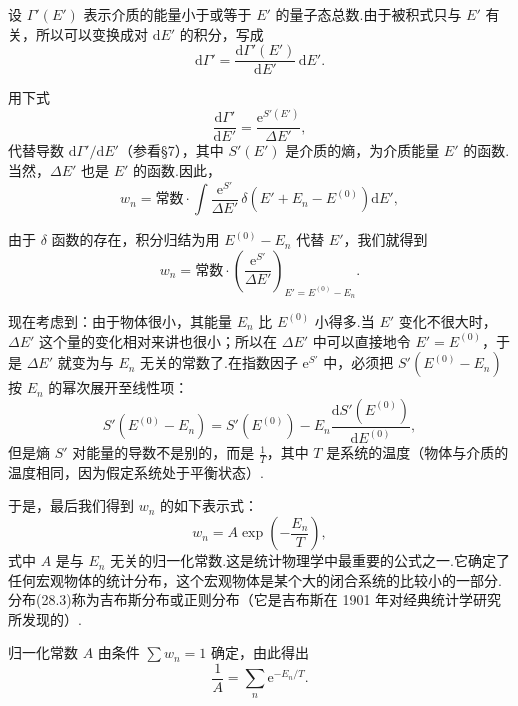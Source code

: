设 $\varGamma'(E')$ 表示介质的能量小于或等于 $E'$ 的量子态总数.由于被积式只与 $E'$ 有关，所以可以变换成对 $\mathrm{d}E'$ 的积分，写成
\begin{equation*}
  \mathrm{d}\varGamma'=\frac{\mathrm{d}\varGamma'(E')}{\mathrm{d}E'}\,\mathrm{d}E'.
\end{equation*}

用下式
\begin{equation*}
  \frac{\mathrm{d}\varGamma'}{\mathrm{d}E'}=\frac{\mathrm{e}^{S'(E')}}{\Delta E'},
\end{equation*}
代替导数 $\mathrm{d}\varGamma'/\mathrm{d}E'$（参看§7），其中 $S'(E')$ 是介质的熵，为介质能量 $E'$ 的函数.当然，$\Delta E'$ 也是 $E'$ 的函数.因此，
\begin{equation*}
  w_n=\text{常数}\cdot\int\frac{\mathrm{e}^{S'}}{\Delta E'}\,\delta\left(E'+E_n-E^{(0)}\right)\mathrm{d}E',
\end{equation*}

由于 $\delta$ 函数的存在，积分归结为用 $E^{(0)}-E_n$ 代替 $E'$，我们就得到
\begin{equation}
  w_n=\text{常数}\cdot\left(\frac{\mathrm{e}^{S'}}{\Delta E'}\right)_{E'=E^{(0)}-E_n}.
\end{equation}

现在考虑到：由于物体很小，其能量 $E_n$ 比 $E^{(0)}$ 小得多.当 $E'$ 变化不很大时，$\Delta E'$ 这个量的变化相对来讲也很小；所以在 $\Delta E'$ 中可以直接地令 $E'=E^{(0)}$，于是 $\Delta E'$ 就变为与 $E_n$ 无关的常数了.在指数因子 $\mathrm{e}^{S'}$ 中，必须把 $S'(E^{(0)}-E_n)$ 按 $E_n$ 的幂次展开至线性项：
\begin{equation*}
  S'\left(E^{(0)}-E_n\right)=S'\left(E^{(0)}\right)-E_n\frac{\mathrm{d}S'\left(E^{(0)}\right)}{\mathrm{d}E^{(0)}},
\end{equation*}
但是熵 $S'$ 对能量的导数不是别的，而是 $\frac{1}{T}$，其中 $T$ 是系统的温度（物体与介质的温度相同，因为假定系统处于平衡状态）.

于是，最后我们得到 $w_n$ 的如下表示式：
\begin{equation}
  w_n=A\exp\left(-\frac{E_n}{T}\right),
\end{equation}
式中 $A$ 是与 $E_n$ 无关的归一化常数.这是统计物理学中最重要的公式之一.它确定了任何宏观物体的统计分布，这个宏观物体是某个大的闭合系统的比较小的一部分.分布(28.3)称为吉布斯分布或正则分布（它是吉布斯在 1901 年对经典统计学研究所发现的）.

归一化常数 $A$ 由条件 $\sum w_n=1$ 确定，由此得出
\begin{equation}
  \frac{1}{A}=\sum_n\mathrm{e}^{-E_n/T}.
\end{equation}

